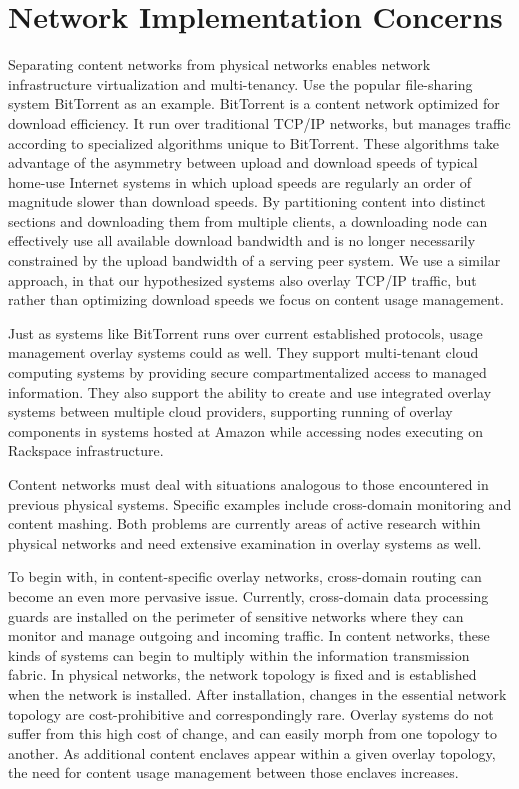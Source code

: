 \section{Network Implementation Concerns}
Separating content networks from physical networks enables network infrastructure virtualization and multi-tenancy.  Use the popular file-sharing system BitTorrent as an example.  BitTorrent is a content network optimized for download efficiency.  It run over traditional TCP/IP networks, but manages traffic according to specialized algorithms unique to BitTorrent.  These algorithms take advantage of the asymmetry between upload and download speeds of typical home-use Internet systems in which upload speeds are regularly an order of magnitude slower than download speeds.  By partitioning content into distinct sections and downloading them from multiple clients, a downloading node can effectively use all available download bandwidth and is no longer necessarily constrained by the upload bandwidth of a serving peer system.  We use a similar approach, in that our hypothesized systems also overlay TCP/IP traffic, but rather than optimizing download speeds we focus on content usage management.

Just as systems like BitTorrent runs over current established protocols, usage management overlay systems could as well.  They support multi-tenant cloud computing systems by providing secure compartmentalized access to managed information.  They also support the ability to create and use integrated overlay systems between multiple cloud providers, supporting running of overlay components in systems hosted at Amazon while accessing nodes executing on Rackspace infrastructure.

Content networks must deal with situations analogous to those encountered in previous physical systems.  Specific examples include cross-domain monitoring and content mashing.  Both problems are currently areas of active research within physical networks and need extensive examination in overlay systems as well.

To begin with, in content-specific overlay networks, cross-domain routing can become an even more pervasive issue.  Currently, cross-domain data processing guards are installed on the perimeter of sensitive networks where they can monitor and manage outgoing and incoming traffic.  In content networks, these kinds of systems can begin to multiply within the information transmission fabric.  In physical networks, the network topology is fixed and is established when the network is installed.  After installation, changes in the essential network topology are cost-prohibitive and correspondingly rare.  Overlay systems do not suffer from this high cost of change, and can easily morph from one topology to another.  As additional content enclaves appear within a given overlay topology, the need for content usage management between those enclaves increases.

